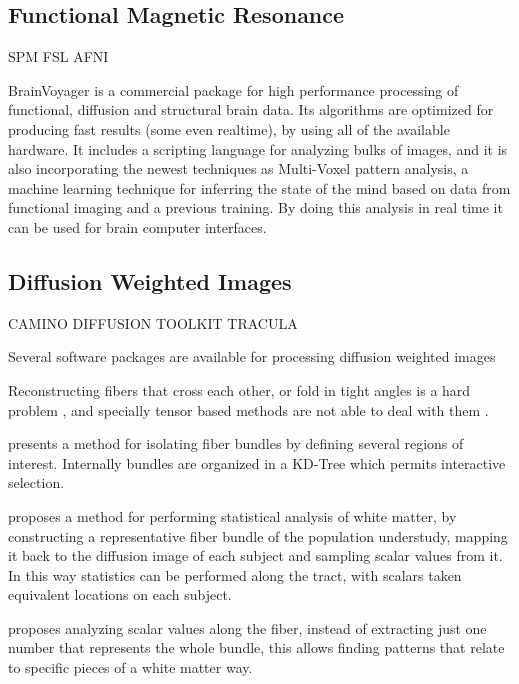 \subsection{Functional Magnetic Resonance}

SPM
FSL
AFNI

BrainVoyager \autocite{goebel_brainvoyagerpast_2012} is a commercial package for high performance processing of functional, diffusion and structural brain data. Its algorithms are optimized for producing fast results (some even realtime), by using all of the available hardware. It includes a scripting language for analyzing bulks of images, and it is also incorporating the newest techniques as Multi-Voxel pattern analysis, a machine learning technique for inferring the state of the mind based on data from functional imaging and a previous training. By doing this analysis in real time it can be used for brain computer interfaces. 

\subsection{Diffusion Weighted Images}

CAMINO
DIFFUSION TOOLKIT
TRACULA



Several software packages are available for processing diffusion weighted images \autocite{hasan_review_2011}

Reconstructing fibers that cross each other, or fold in tight angles is a hard problem \autocite{fillard_quantitative_2011}, and specially tensor based methods are not able to deal with them \autocite{tournier_diffusion_2011}.


\autocite{blaas_fast_2005} presents a method for isolating fiber bundles by defining several regions of interest. Internally bundles are organized in a KD-Tree which permits interactive selection.

\autocite{goodlett_group_2008} proposes a method for performing statistical analysis of white matter, by constructing a representative fiber bundle of the population understudy, mapping it back to the diffusion image of each subject and sampling scalar values from it. In this way statistics can be performed along the tract, with scalars taken equivalent locations on each subject.

\autocite{colby_along-tract_2011} proposes analyzing scalar values along the fiber, instead of extracting just one number that represents the whole bundle, this allows finding patterns that relate to specific pieces of a white matter way.



